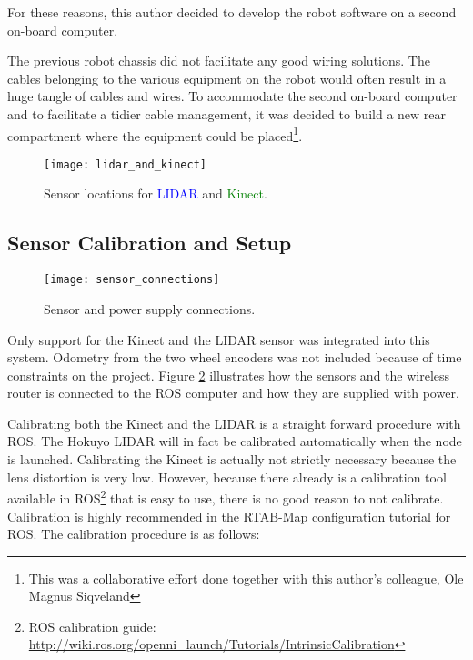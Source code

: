 For these reasons, this author decided to develop the robot software on a second on-board computer. 

The previous robot chassis did not facilitate any good wiring solutions. The cables belonging to the various equipment on the robot would often result in a huge tangle of cables and wires. To accommodate the second on-board computer and to facilitate a tidier cable management, it was decided to build a new rear compartment where the equipment could be placed\footnote{This was a collaborative effort done together with this author's colleague, Ole Magnus Siqveland }.




\begin{figure}[h]
	\centering
	\texttt{[image: lidar\_and\_kinect]}
	\caption{Sensor locations for \textcolor{blue}{LIDAR} and \textcolor{green}{Kinect}. }
	\label{fig:kinect_and_lidar}
\end{figure}

\subsection{Sensor Calibration and Setup}

\begin{figure}[h]
	\centering
	\texttt{[image: sensor\_connections]}
	\caption{Sensor and power supply connections. }
	\label{fig:sensor_connections}
\end{figure}

Only support for the Kinect and the \ac{LIDAR} sensor was integrated into this system. Odometry from the two wheel encoders was not included because of time constraints on the project. Figure \ref{fig:sensor_connections} illustrates how the sensors and the wireless router is connected to the \ac{ROS} computer and how they are supplied with power.

Calibrating both the Kinect and the \ac{LIDAR} is a straight forward procedure with \ac{ROS}. The Hokuyo \ac{LIDAR} will in fact be calibrated automatically when the node is launched. Calibrating the Kinect is actually not strictly necessary because the lens distortion is very low. However, because there already is a calibration tool available in \ac{ROS}\footnote{ROS calibration guide: \url{http://wiki.ros.org/openni_launch/Tutorials/IntrinsicCalibration}} that is easy to use, there is no good reason to not calibrate. Calibration is highly recommended in the \ac{RTAB-Map} configuration tutorial for \ac{ROS}\cite{rtabmap_setup}. The calibration procedure is as follows:

